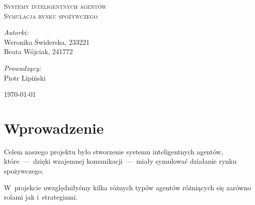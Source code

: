 \documentclass[12pt]{article}
\begin{document}
\graphicspath{{obrazki}}
\begin{titlepage}
\vspace*{\fill}
 \begin{center}

  \textsc{\LARGE Systemy inteligentnych agentów}\\[2.0cm]
  \textsc{\Large Symulacja rynku spożywczego}\\[1.5cm] 

\vspace*{\fill}
  \begin{minipage}{0.4\textwidth}
    \begin{flushleft} \large
    \emph{Autorki:}\\
    Weronika Świderska, 233221 \\ Beata Wójciak, 241772
    \end{flushleft}
    \end{minipage}
    \begin{minipage}{0.4\textwidth}
    \begin{flushright} \large
    \emph{Prowadzący:} \\
    Piotr Lipiński
    \end{flushright}
  \end{minipage}

\vspace*{\fill}
{\large \today}
 \end{center}

\end{titlepage}
\newpage
\tableofcontents
\newpage

\section{Wprowadzenie}
Celem naszego projektu było stworzenie systemu inteligentnych agentów, które~---~dzięki wzajemnej komunikacji~---~miały symulować działanie rynku spożywczego.

W~projekcie uwzględniłyśmy kilka różnych typów agentów różniących się zarówno rolami jak i~strategiami.
\end{document}
